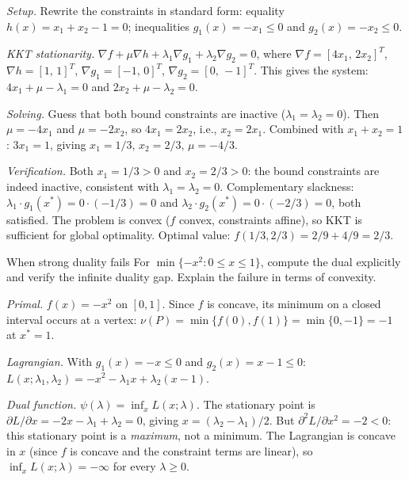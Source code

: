 \solution
\textit{Setup.}
Rewrite the constraints in standard form:
equality $h(x) = x_1 + x_2 - 1 = 0$;
inequalities $g_1(x) = -x_1 \leq 0$ and $g_2(x) = -x_2 \leq 0$.

\textit{KKT stationarity.}
$\nabla f + \mu \nabla h + \lambda_1 \nabla g_1 + \lambda_2 \nabla g_2 = 0$, where
$\nabla f = [4x_1,\, 2x_2]^T$, $\nabla h = [1,\, 1]^T$, $\nabla g_1 = [-1,\, 0]^T$, $\nabla g_2 = [0,\, -1]^T$.
This gives the system:
$4x_1 + \mu - \lambda_1 = 0$ and $2x_2 + \mu - \lambda_2 = 0$.

\textit{Solving.}
Guess that both bound constraints are inactive ($\lambda_1 = \lambda_2 = 0$).
Then $\mu = -4x_1$ and $\mu = -2x_2$, so $4x_1 = 2x_2$, i.e., $x_2 = 2x_1$.
Combined with $x_1 + x_2 = 1$: $3x_1 = 1$, giving $x_1 = 1/3$, $x_2 = 2/3$, $\mu = -4/3$.

\textit{Verification.}
Both $x_1 = 1/3 > 0$ and $x_2 = 2/3 > 0$: the bound constraints are indeed inactive, consistent with $\lambda_1 = \lambda_2 = 0$.
Complementary slackness: $\lambda_1 \cdot g_1(x^*) = 0 \cdot (-1/3) = 0$ and $\lambda_2 \cdot g_2(x^*) = 0 \cdot (-2/3) = 0$, both satisfied.
The problem is convex ($f$ convex, constraints affine), so KKT is sufficient for global optimality.
Optimal value: $f(1/3, 2/3) = 2/9 + 4/9 = 2/3$.

\begin{exercise}{When strong duality fails}\label{ex:dual-counterexample}
	For $\min\{-x^2 : 0 \leq x \leq 1\}$, compute the dual explicitly and verify the infinite duality gap.
	Explain the failure in terms of convexity.
\end{exercise}

\solution
\textit{Primal.}
$f(x) = -x^2$ on $[0, 1]$.
Since $f$ is concave, its minimum on a closed interval occurs at a vertex: $\nu(P) = \min\{f(0), f(1)\} = \min\{0, -1\} = -1$ at $x^* = 1$.

\textit{Lagrangian.}
With $g_1(x) = -x \leq 0$ and $g_2(x) = x - 1 \leq 0$:
$L(x; \lambda_1, \lambda_2) = -x^2 - \lambda_1 x + \lambda_2(x - 1)$.

\textit{Dual function.}
$\psi(\lambda) = \inf_x L(x; \lambda)$.
The stationary point is $\partial L / \partial x = -2x - \lambda_1 + \lambda_2 = 0$, giving $x = (\lambda_2 - \lambda_1)/2$.
But $\partial^2 L / \partial x^2 = -2 < 0$: this stationary point is a \emph{maximum}, not a minimum.
The Lagrangian is concave in $x$ (since $f$ is concave and the constraint terms are linear), so $\inf_x L(x; \lambda) = -\infty$ for every $\lambda \geq 0$.

